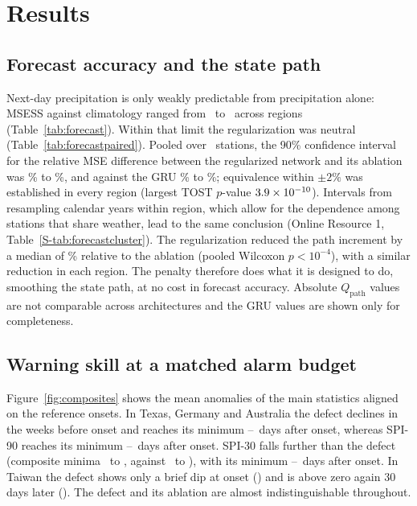 \documentclass[pdflatex,sn-mathphys-ay]{sn-jnl}
\theoremstyle{thmstyletwo}
\begin{document}
\section{Results}\label{sec:results}
\subsection{Forecast accuracy and the state path}\label{sec:res_forecast}
Next-day precipitation is only weakly predictable from precipitation alone: MSESS against climatology
ranged from \msssmin\ to \msssmax\ across regions (Table~\ref{tab:forecast}). Within that limit the
regularization was neutral (Table~\ref{tab:forecastpaired}). Pooled over \nstall\ stations, the 90\% confidence interval for the relative
MSE difference between the regularized network and its ablation was \msediffloall\% to \msediffhiall\%,
and against the GRU \msediffgruloall\% to \msediffgruhiall\%; equivalence within $\pm2\%$ was
established in every region (largest TOST $p$-value $3.9\times10^{-10}$). Intervals from resampling calendar
years within region, which allow for the dependence among stations that share weather, lead to the same
conclusion (Online Resource 1, Table~\ref{S-tab:forecastcluster}). The regularization reduced the
path increment by a median of \qpathred\% relative to the ablation (pooled Wilcoxon $p<10^{-4}$), with a
similar reduction in each region. The penalty therefore does what it is designed to do, smoothing the
state path, at no cost in forecast accuracy. Absolute $Q_{\mathrm{path}}$ values are not comparable
across architectures and the GRU values are shown only for completeness.



\subsection{Warning skill at a matched alarm budget}\label{sec:res_warning}
Figure~\ref{fig:composites} shows the mean anomalies of the main statistics aligned on the reference
onsets. In Texas, Germany and Australia the defect declines in the weeks before onset and reaches its
minimum \compDonelaglo--\compDonelaghi\ days after onset, whereas SPI-90 reaches its minimum
\compDthreelaglo--\compDthreelaghi\ days after onset. SPI-30 falls further than the defect (composite
minima \compDsevenminlo\ to \compDsevenminhi, against \compDoneminlo\ to \compDoneminhi), with its
minimum \compDsevenlaglo--\compDsevenlaghi\ days after onset. In Taiwan the defect shows only a brief
dip at onset (\compDonemintaiwan) and is above zero again 30 days later (\compDonepostaiwan). The defect
and its ablation are almost indistinguishable throughout.
\end{document}
